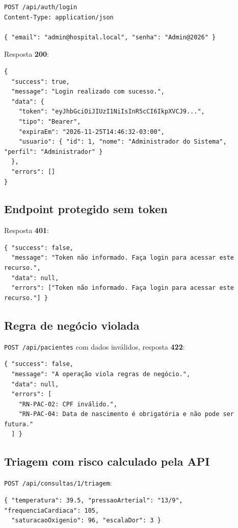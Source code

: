\documentclass[12pt,a4paper]{article}
\newcommand{\cod}[1]{\texttt{#1}}
\begin{document}
\begin{lstlisting}
POST /api/auth/login
Content-Type: application/json

{ "email": "admin@hospital.local", "senha": "Admin@2026" }
\end{lstlisting}

Resposta \textbf{200}:
\begin{lstlisting}
{
  "success": true,
  "message": "Login realizado com sucesso.",
  "data": {
    "token": "eyJhbGciOiJIUzI1NiIsInR5cCI6IkpXVCJ9...",
    "tipo": "Bearer",
    "expiraEm": "2026-11-25T14:46:32-03:00",
    "usuario": { "id": 1, "nome": "Administrador do Sistema", "perfil": "Administrador" }
  },
  "errors": []
}
\end{lstlisting}

\subsection{Endpoint protegido sem token}

Resposta \textbf{401}:
\begin{lstlisting}
{ "success": false,
  "message": "Token não informado. Faça login para acessar este recurso.",
  "data": null,
  "errors": ["Token não informado. Faça login para acessar este recurso."] }
\end{lstlisting}

\subsection{Regra de negócio violada}

\cod{POST /api/pacientes} com dados inválidos, resposta \textbf{422}:
\begin{lstlisting}
{ "success": false,
  "message": "A operação viola regras de negócio.",
  "data": null,
  "errors": [
    "RN-PAC-02: CPF inválido.",
    "RN-PAC-04: Data de nascimento é obrigatória e não pode ser futura."
  ] }
\end{lstlisting}

\subsection{Triagem com risco calculado pela API}

\cod{POST /api/consultas/1/triagem}:
\begin{lstlisting}
{ "temperatura": 39.5, "pressaoArterial": "13/9", "frequenciaCardiaca": 105,
  "saturacaoOxigenio": 96, "escalaDor": 3 }
\end{lstlisting}
\end{document}
